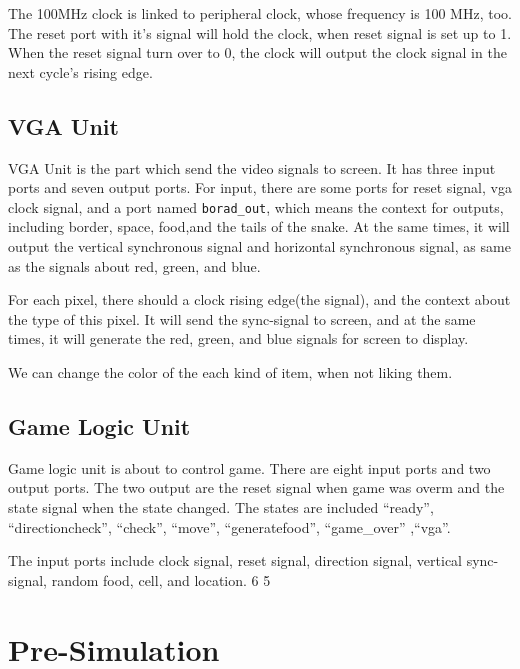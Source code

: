 \documentclass{article}
\begin{document}
    The 100MHz clock is linked to peripheral clock, whose frequency is 100 MHz, too.
    The reset port with it's signal will hold the clock, when reset signal is set up to 1.
    When the reset signal turn over to 0, the clock will output the clock signal in the next cycle's rising edge.
    
    \subsection{VGA Unit}
    \label{sec:vgaunit}
    
    VGA Unit is the part which send the video signals to screen. It has three input ports and seven output ports.
    For input, there are some ports for reset signal, vga clock signal, and a port named \verb|borad_out|,
    which means the context for outputs, including border, space, food,and the tails of the snake.
    At the same times, it will output the vertical synchronous signal and horizontal synchronous signal,
    as same as the signals about red, green, and blue.
    
    For each pixel, there should a clock rising edge(the signal), and the context about the type of this pixel.
    It will send the sync-signal to screen, and at the same times, it will generate the red, green, and blue signals for
    screen to display.
    
    We can change the color of the each kind of item, when not liking them.
     
     \subsection{Game Logic Unit}
     \label{sec:gamelogicunit}

     Game logic unit is about to control game. There are eight input ports and two output ports. 
     The two output are the reset signal when game was overm and the state signal when the state changed.
     The states are included ``ready'', ``directioncheck'', ``check'', ``move'', ``generatefood'', ``game_over'' ,``vga''.

     The input ports include clock signal, reset signal, direction signal, vertical sync-signal, random food, cell, and location. 6 5

    
    \section{Pre-Simulation}
    \label{sec:presimulation}
    
\end{document}

